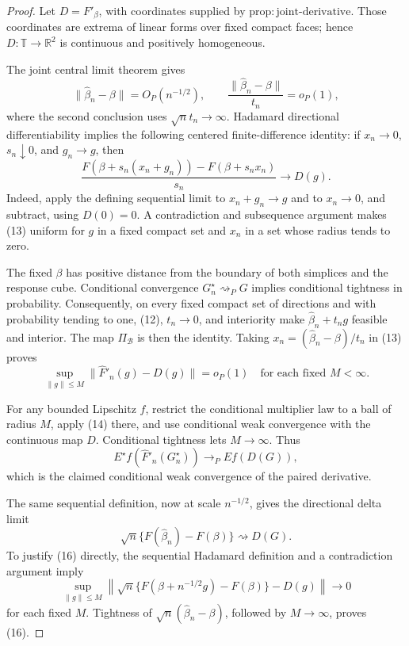 \documentclass{article}
\begin{document}
\begin{proof}
Let \(D=F'_\beta\), with coordinates supplied by \(\mathrm{prop:joint\text{-}derivative}\).  Those coordinates are extrema of linear forms over fixed compact faces; hence \(D:\mathbb T\to\mathbb R^2\) is continuous and positively homogeneous.

The joint central limit theorem gives
\[
\|\widehat\beta_n-\beta\|=O_P(n^{-1/2}),
\qquad
\frac{\|\widehat\beta_n-\beta\|}{t_n}=o_P(1),
\tag{12}
\]
where the second conclusion uses \(\sqrt n t_n\to\infty\).  Hadamard directional differentiability implies the following centered finite-difference identity: if \(x_n\to0\), \(s_n\downarrow0\), and \(g_n\to g\), then
\[
\frac{F(\beta+s_n(x_n+g_n))-F(\beta+s_nx_n)}{s_n}
\longrightarrow D(g).
\tag{13}
\]
Indeed, apply the defining sequential limit to \(x_n+g_n\to g\) and to \(x_n\to0\), and subtract, using \(D(0)=0\).  A contradiction and subsequence argument makes (13) uniform for \(g\) in a fixed compact set and \(x_n\) in a set whose radius tends to zero.

The fixed \(\beta\) has positive distance from the boundary of both simplices and the response cube.  Conditional convergence \(G_n^\star\rightsquigarrow_PG\) implies conditional tightness in probability.  Consequently, on every fixed compact set of directions and with probability tending to one, (12), \(t_n\to0\), and interiority make \(\widehat\beta_n+t_ng\) feasible and interior.  The map \(\Pi_{\mathcal B}\) is then the identity.  Taking \(x_n=(\widehat\beta_n-\beta)/t_n\) in (13) proves
\[
\sup_{\|g\|\leq M}
\|\widehat F'_n(g)-D(g)\|=o_P(1)
\quad\text{for each fixed }M<\infty.
\tag{14}
\]

For any bounded Lipschitz \(f\), restrict the conditional multiplier law to a ball of radius \(M\), apply (14) there, and use conditional weak convergence with the continuous map \(D\).  Conditional tightness lets \(M\to\infty\).  Thus
\[
E^\star f(\widehat F'_n(G_n^\star))
\longrightarrow_P E f(D(G)),
\tag{15}
\]
which is the claimed conditional weak convergence of the paired derivative.

The same sequential definition, now at scale \(n^{-1/2}\), gives the directional delta limit
\[
\sqrt n\{F(\widehat\beta_n)-F(\beta)\}\rightsquigarrow D(G).
\tag{16}
\]
To justify (16) directly, the sequential Hadamard definition and a contradiction argument imply
\[
\sup_{\|g\|\leq M}
\left\|\sqrt n\{F(\beta+n^{-1/2}g)-F(\beta)\}-D(g)\right\|\to0
\]
for each fixed \(M\).  Tightness of \(\sqrt n(\widehat\beta_n-\beta)\), followed by \(M\to\infty\), proves (16).


\end{proof}
\end{document}
